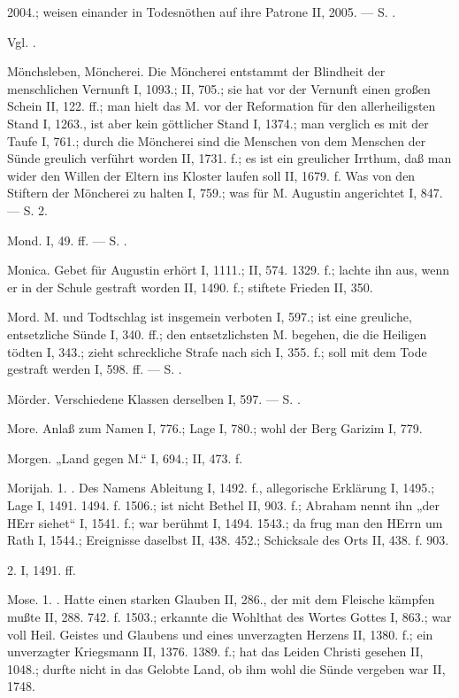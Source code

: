 2004.; weisen einander in Todesnöthen auf ihre Patrone II, 2005. — S. .

Vgl. .

Mönchsleben, Möncherei. Die Möncherei entstammt der Blindheit der menschlichen Vernunft I, 1093.; II, 705.; sie hat vor der Vernunft einen großen Schein II, 122. ff.; man hielt das M. vor der Reformation für den allerheiligsten Stand I, 1263., ist aber kein göttlicher Stand I, 1374.; man verglich es mit der Taufe I, 761.; durch die Möncherei sind die Menschen von dem Menschen der Sünde greulich verführt worden II, 1731. f.; es ist ein greulicher Irrthum, daß man wider den Willen der Eltern ins Kloster laufen soll II, 1679. f. Was von den Stiftern der Möncherei zu halten I, 759.; was für M. Augustin angerichtet I, 847. — S.  2.

Mond. I, 49. ff. — S. .

Monica. Gebet für Augustin erhört I, 1111.; II, 574. 1329. f.; lachte ihn aus, wenn er in der Schule gestraft worden II, 1490. f.; stiftete Frieden II, 350.

Mord. M. und Todtschlag ist insgemein verboten I, 597.; ist eine greuliche, entsetzliche Sünde I, 340. ff.; den entsetzlichsten M. begehen, die die Heiligen tödten I, 343.; zieht schreckliche Strafe nach sich I, 355. f.; soll mit dem Tode gestraft werden I, 598. ff. — S. .

Mörder. Verschiedene Klassen derselben I, 597. — S. .

More. Anlaß zum Namen I, 776.; Lage I, 780.; wohl der Berg Garizim I, 779.

Morgen. „Land gegen M.“ I, 694.; II, 473. f.

Morijah. 1. . Des Namens Ableitung I, 1492. f., allegorische Erklärung I, 1495.; Lage I, 1491. 1494. f. 1506.; ist nicht Bethel II, 903. f.; Abraham nennt ihn „der HErr siehet“ I, 1541. f.; war berühmt I, 1494. 1543.; da frug man den HErrn um Rath I, 1544.; Ereignisse daselbst II, 438. 452.; Schicksale des Orts II, 438. f. 903.

2.  I, 1491. ff.

Mose. 1. . Hatte einen starken Glauben II, 286., der mit dem Fleische kämpfen mußte II, 288. 742. f. 1503.; erkannte die Wohlthat des Wortes Gottes I, 863.; war voll Heil. Geistes und Glaubens und eines unverzagten Herzens II, 1380. f.; ein unverzagter Kriegsmann II, 1376. 1389. f.; hat das Leiden Christi gesehen II, 1048.; durfte nicht in das Gelobte Land, ob ihm wohl die Sünde vergeben war II, 1748.

